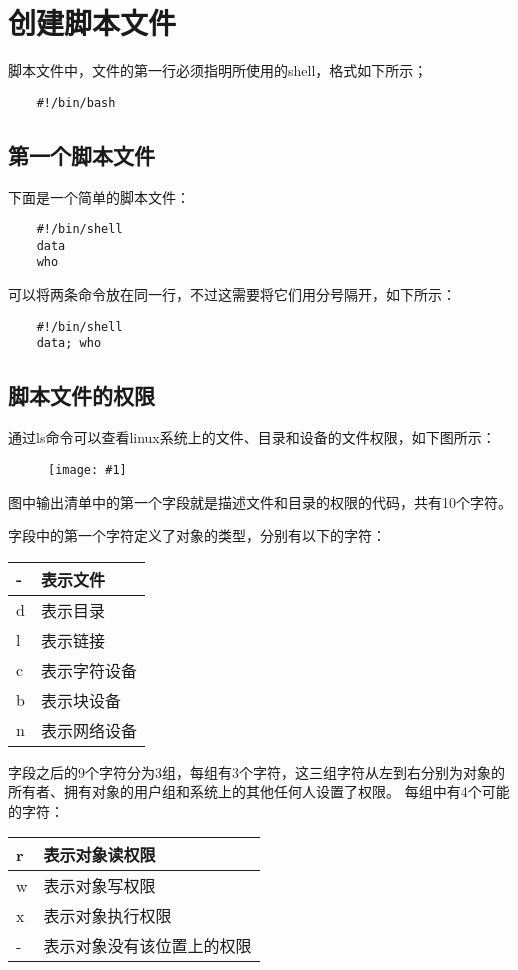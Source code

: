 \documentclass[a4paper,left=2.5cm,right=2.5cm,11pt]{article}
\newcommand{\fic}[1]{\begin{figure}[H]
		\center
		\texttt{[image: \#1]}
	\end{figure}}
\begin{document}
\tableofcontents

\clearpage

\section{创建脚本文件}
	脚本文件中，文件的第一行必须指明所使用的shell，格式如下所示；
	\begin{lstlisting}
	#!/bin/bash
	\end{lstlisting}

\subsection{第一个脚本文件}
	下面是一个简单的脚本文件：
	\begin{lstlisting}
	#!/bin/shell
	data
	who
	\end{lstlisting}

	可以将两条命令放在同一行，不过这需要将它们用分号隔开，如下所示：
	\begin{lstlisting}
	#!/bin/shell
	data; who
	\end{lstlisting}

\subsection{脚本文件的权限}
	通过ls命令可以查看linux系统上的文件、目录和设备的文件权限，如下图所示：
	\fic{1.png}

	图中输出清单中的第一个字段就是描述文件和目录的权限的代码，共有10个字符。\par
	字段中的第一个字符定义了对象的类型，分别有以下的字符：
	\begin{longtable}{p{2cm}p{4cm}}
	\hline
	- & 表示文件 \\
	\hline
	d & 表示目录 \\
	\hline
	l & 表示链接 \\
	\hline
	c & 表示字符设备 \\
	\hline
	b & 表示块设备 \\
	\hline
	n & 表示网络设备 \\
	\hline
	\end{longtable}

	字段之后的9个字符分为3组，每组有3个字符，这三组字符从左到右分别为对象的所有者、拥有对象的用户组和系统上的其他任何人设置了权限。
	每组中有4个可能的字符：
	\begin{longtable}{p{2cm}p{4cm}}
	\hline
	r & 表示对象读权限 \\
	\hline
	w & 表示对象写权限 \\
	\hline
	x & 表示对象执行权限 \\
	\hline
	- & 表示对象没有该位置上的权限 \\
	\hline
	\end{longtable}
\end{document}
